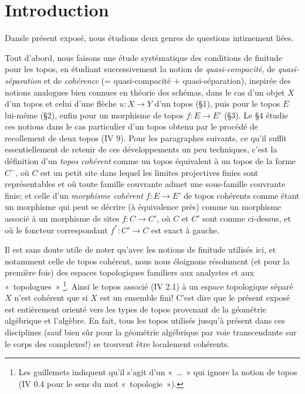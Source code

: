 \section{Introduction}

Dans\pageoriginale le présent exposé, nous étudions deux
genres de questions
intimement liées.

Tout d'abord, nous faisons une étude systématique des conditions de
finitude pour les topos, en étudiant successivement la notion de
\emph{quasi-compacité}, de \emph{quasi-séparation} et de
\emph{cohérence} (= quasi-compacité $+$ quasi-séparation),
inspirée
des notions analogues bien connues en théorie des schémas, dans le
cas d'un objet $X$ d'un topos et celui d'une flèche $u : X \to Y$
d'un topos (\S 1), puis pour le topos $E$ lui-même (\S 2), enfin
pour un morphisme de topos $f : E \to E'$ (\S 3). Le \S 4 étudie ces
notions dans le cas particulier d'un topos obtenu par le procédé de
recollement de deux topos (IV 9). Pour les paragraphes suivants, ce
qu'il suffit essentiellement de retenir de ces développements un peu
techniques, c'est la définition d'un \emph{topos cohérent} comme un
topos équivalent à un topos de la forme $C^{\sim}$, où $C$ est
un petit site dans lequel les limites projectives finies sont
représentables et où toute famille couvrante admet une
sous-famille couvrante finie; et celle d'un \emph{morphisme
cohérent} $f : E \to E'$ de topos cohérents comme étant un morphisme
qui peut se décrire (à équivalence près) comme un morphisme associé
à un morphisme de sites $f : C \to C'$, où $C$ et $C'$ sont
comme ci-dessus, et où le foncteur correspondant $f^{\ast} :
C'\to C$ est exact à gauche.

Il est sans doute utile de noter qu'avec les notions de finitude
utilisés ici, et notamment celle de topos cohérent, nous nous
éloignons résolument (et pour la première fois) des espaces
topologiques familiers aux analystes et aux « topologues »
\footnote{Les guillemets indiquent qu'il s'agit d'un
  « \ldots » qui ignore la notion de topos (\cf IV 0.4 pour le
  sens du mot « topologie »).}. Ainsi le topos associé (IV 2.1) à un espace
topologique séparé $X$ n'est cohérent que si $X$ est un ensemble fini!
C'est dire que le présent exposé est entièrement orienté vers les
types de topos provenant de la géométrie algébrique et l'algèbre.
En fait, tous les topos utilisés jusqu'à présent dans ces disciplines (sauf bien sûr
pour la géométrie algébrique par voie transcendante sur le corps des
complexes!) se trouvent être localement cohérents.

